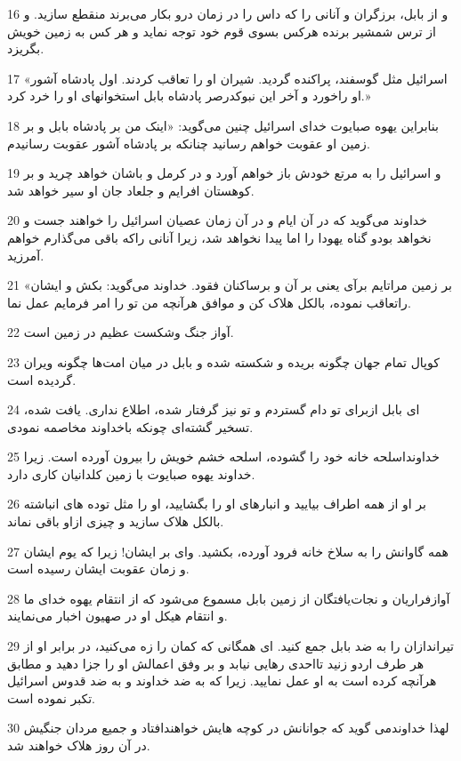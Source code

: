 \par 16 و از بابل، برزگران و آنانی را که داس را در زمان درو بکار می‌برند منقطع سازید. و از ترس شمشیر برنده هرکس بسوی قوم خود توجه نماید و هر کس به زمین خویش بگریزد.
\par 17 «اسرائیل مثل گوسفند، پراکنده گردید. شیران او را تعاقب کردند. اول پادشاه آشور او راخورد و آخر این نبوکدرصر پادشاه بابل استخوانهای او را خرد کرد.»
\par 18 بنابراین یهوه صبایوت خدای اسرائیل چنین می‌گوید: «اینک من بر پادشاه بابل و بر زمین او عقوبت خواهم رسانید چنانکه بر پادشاه آشور عقوبت رسانیدم.
\par 19 و اسرائیل را به مرتع خودش باز خواهم آورد و در کرمل و باشان خواهد چرید و بر کوهستان افرایم و جلعاد جان او سیر خواهد شد.
\par 20 خداوند می‌گوید که در آن ایام و در آن زمان عصیان اسرائیل را خواهند جست و نخواهد بودو گناه یهودا را اما پیدا نخواهد شد، زیرا آنانی راکه باقی می‌گذارم خواهم آمرزید.
\par 21 «بر زمین مراتایم برآی یعنی بر آن و برساکنان فقود. خداوند می‌گوید: بکش و ایشان راتعاقب نموده، بالکل هلاک کن و موافق هر‌آنچه من تو را امر فرمایم عمل نما.
\par 22 آواز جنگ وشکست عظیم در زمین است.
\par 23 کوپال تمام جهان چگونه بریده و شکسته شده و بابل در میان امت‌ها چگونه ویران گردیده است.
\par 24 ‌ای بابل ازبرای تو دام گستردم و تو نیز گرفتار شده، اطلاع نداری. یافت شده، تسخیر گشته‌ای چونکه باخداوند مخاصمه نمودی.
\par 25 خداونداسلحه خانه خود را گشوده، اسلحه خشم خویش را بیرون آورده است. زیرا خداوند یهوه صبایوت با زمین کلدانیان کاری دارد.
\par 26 بر او از همه اطراف بیایید و انبارهای او را بگشایید، او را مثل توده های انباشته بالکل هلاک سازید و چیزی ازاو باقی نماند.
\par 27 همه گاوانش را به سلاخ خانه فرود آورده، بکشید. وای بر ایشان! زیرا که یوم ایشان و زمان عقوبت ایشان رسیده است.
\par 28 آوازفراریان و نجات‌یافتگان از زمین بابل مسموع می‌شود که از انتقام یهوه خدای ما و انتقام هیکل او در صهیون اخبار می‌نمایند.
\par 29 تیراندازان را به ضد بابل جمع کنید. ای همگانی که کمان را زه می‌کنید، در برابر او از هر طرف اردو زنید تااحدی رهایی نیابد و بر وفق اعمالش او را جزا دهید و مطابق هر‌آنچه کرده است به او عمل نمایید. زیرا که به ضد خداوند و به ضد قدوس اسرائیل تکبر نموده است. 
\par 30 لهذا خداوندمی گوید که جوانانش در کوچه هایش خواهندافتاد و جمیع مردان جنگیش در آن روز هلاک خواهند شد.
